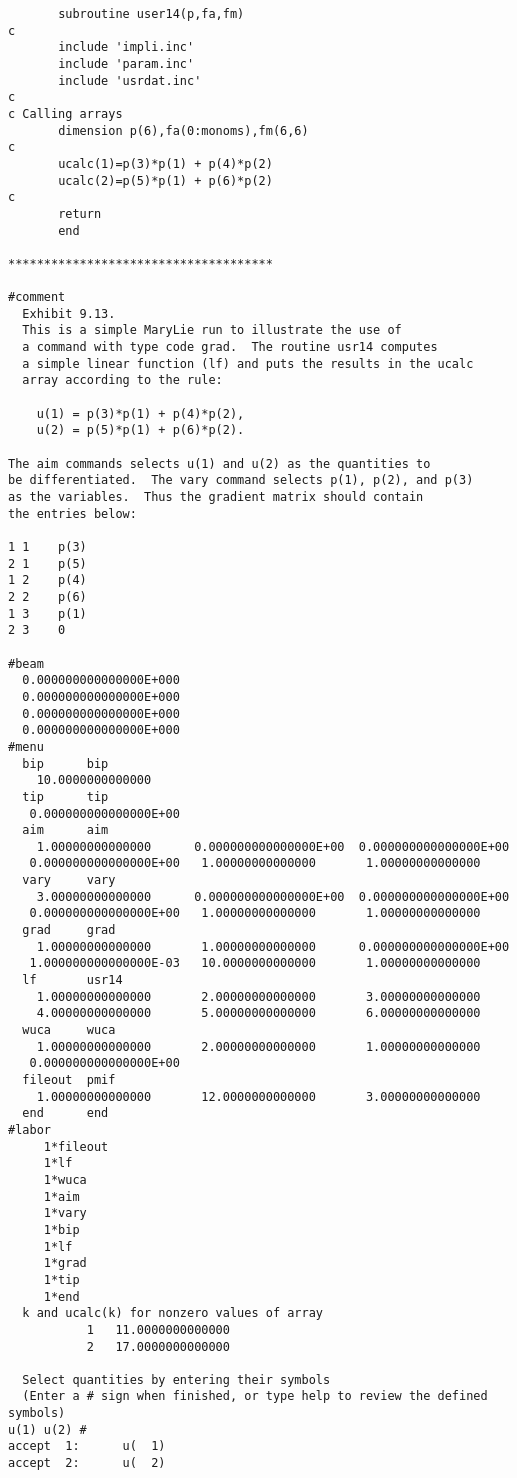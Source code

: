\vspace{5mm}
\begin{footnotesize}
\begin{verbatim}
       subroutine user14(p,fa,fm)
c
       include 'impli.inc'
       include 'param.inc'
       include 'usrdat.inc'
c
c Calling arrays
       dimension p(6),fa(0:monoms),fm(6,6)
c
       ucalc(1)=p(3)*p(1) + p(4)*p(2)
       ucalc(2)=p(5)*p(1) + p(6)*p(2)
c
       return
       end

*************************************

#comment
  Exhibit 9.13.
  This is a simple MaryLie run to illustrate the use of
  a command with type code grad.  The routine usr14 computes
  a simple linear function (lf) and puts the results in the ucalc
  array according to the rule:

    u(1) = p(3)*p(1) + p(4)*p(2),
    u(2) = p(5)*p(1) + p(6)*p(2).

The aim commands selects u(1) and u(2) as the quantities to
be differentiated.  The vary command selects p(1), p(2), and p(3)
as the variables.  Thus the gradient matrix should contain
the entries below:

1 1    p(3)
2 1    p(5)
1 2    p(4)
2 2    p(6)
1 3    p(1)
2 3    0

#beam
  0.000000000000000E+000
  0.000000000000000E+000
  0.000000000000000E+000
  0.000000000000000E+000
#menu
  bip      bip
    10.0000000000000
  tip      tip
   0.000000000000000E+00
  aim      aim
    1.00000000000000      0.000000000000000E+00  0.000000000000000E+00
   0.000000000000000E+00   1.00000000000000       1.00000000000000
  vary     vary
    3.00000000000000      0.000000000000000E+00  0.000000000000000E+00
   0.000000000000000E+00   1.00000000000000       1.00000000000000
  grad     grad
    1.00000000000000       1.00000000000000      0.000000000000000E+00
   1.000000000000000E-03   10.0000000000000       1.00000000000000
  lf       usr14
    1.00000000000000       2.00000000000000       3.00000000000000
    4.00000000000000       5.00000000000000       6.00000000000000
  wuca     wuca
    1.00000000000000       2.00000000000000       1.00000000000000
   0.000000000000000E+00
  fileout  pmif
    1.00000000000000       12.0000000000000       3.00000000000000
  end      end
#labor
     1*fileout
     1*lf
     1*wuca
     1*aim
     1*vary
     1*bip
     1*lf
     1*grad
     1*tip
     1*end
  k and ucalc(k) for nonzero values of array
           1   11.0000000000000
           2   17.0000000000000

  Select quantities by entering their symbols
  (Enter a # sign when finished, or type help to review the defined
symbols)
u(1) u(2) #
accept  1:      u(  1)
accept  2:      u(  2)


\end{verbatim}
\end{footnotesize}
